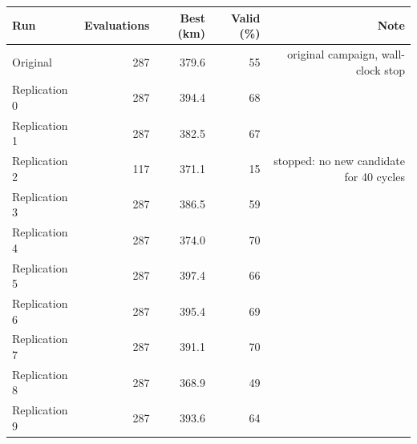 \begin{tabular}{@{}lrrrr@{}}
\toprule
Run & Evaluations & Best (km) & Valid (\%) & Note \\
\midrule
Original & 287 & 379.6 & 55 & original campaign, wall-clock stop \\
Replication 0 & 287 & 394.4 & 68 &  \\
Replication 1 & 287 & 382.5 & 67 &  \\
Replication 2 & 117 & 371.1 & 15 & stopped: no new candidate for 40 cycles \\
Replication 3 & 287 & 386.5 & 59 &  \\
Replication 4 & 287 & 374.0 & 70 &  \\
Replication 5 & 287 & 397.4 & 66 &  \\
Replication 6 & 287 & 395.4 & 69 &  \\
Replication 7 & 287 & 391.1 & 70 &  \\
Replication 8 & 287 & 368.9 & 49 &  \\
Replication 9 & 287 & 393.6 & 64 &  \\
\bottomrule
\end{tabular}
